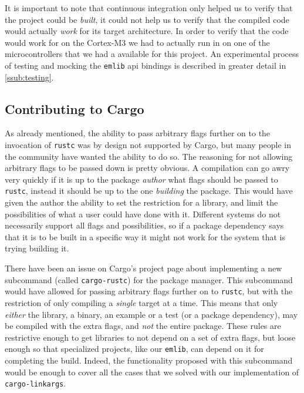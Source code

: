 It is important to note that continuous integration only helped us to verify that the project could be \emph{built}, it could not help us to verify that the compiled code would actually \emph{work} for its target architecture.
In order to verify that the code would work for on the Cortex-M3 we had to actually run in on one of the microcontrollers that we had a available for this project.
An experimental process of testing and mocking the \texttt{emlib} \gls{api} bindings is described in greater detail in \autoref{ssub:testing}.

\subsection{Contributing to Cargo}
\label{ssub:contributing_to_cargo}

As already mentioned, the ability to pass arbitrary flags further on to the invocation of \texttt{rustc} was by design not supported by Cargo, but many people in the \rust community have wanted the ability to do so.
The reasoning for not allowing arbitrary flags to be passed down is pretty obvious.
A compilation can go awry very quickly if it is up to the package \emph{author} what flags should be passed to \texttt{rustc}, instead it should be up to the one \emph{building} the package.
This would have given the author the ability to set the restriction for a library, and limit the possibilities of what a user could have done with it.
Different systems do not necessarily support all flags and possibilities, so if a package dependency says that it is to be built in a specific way it might not work for the system that is trying building it.

There have been an issue on Cargo's project page about implementing a new subcommand (called \texttt{cargo-rustc}) for the package manager.
This subcommand would have allowed for passing arbitrary flags further on to \texttt{rustc}, but with the restriction of only compiling a \emph{single} target at a time.
This means that only \emph{either} the library, a binary, an example or a test (or a package dependency), may be compiled with the extra flags, and \emph{not} the entire package.
These rules are restrictive enough to get libraries to not depend on a set of extra flags, but loose enough so that specialized projects, like our \texttt{emlib}, can depend on it for completing the build.
Indeed, the functionality proposed with this subcommand would be enough to cover all the cases that we solved with our implementation of \texttt{cargo-linkargs}.

